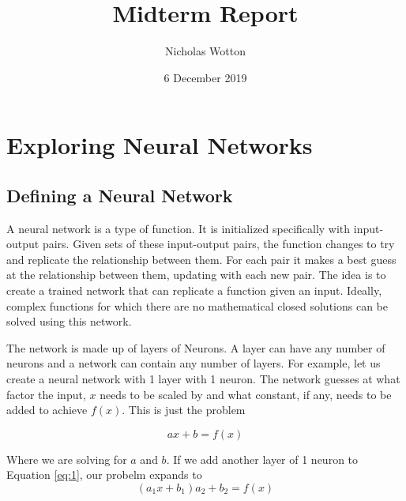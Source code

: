 \documentclass{report}
\title{Midterm Report}
\author{Nicholas Wotton}
\date{6 December 2019}
\begin{document}
\begin{titlepage}
\maketitle
\end{titlepage}

\begin{comment}
Outline
\begin{itemize}
\item What is a Neural Network
\item Derivation of the BSM
\item Combining the Two?
\end{itemize}
\end{comment}

\chapter{Exploring Neural Networks}

\section{Defining a Neural Network}

A neural network is a type of function. It is initialized specifically with input-output pairs. Given sets of these input-output pairs, the function changes to try and replicate the relationship between them. For each pair it makes a best guess at the relationship between them, updating with each new pair. The idea is to create a trained network that can replicate a function given an input. Ideally, complex functions for which there are no mathematical closed solutions can be solved using this network.

The network is made up of layers of Neurons. A layer can have any number of neurons and a network can contain any number of layers. For example, let us create a neural network with 1 layer with 1 neuron. The network guesses at what factor the input, $x$ needs to be scaled by and what constant, if any, needs to be added to achieve $f(x)$. This is just the problem

\begin{equation}
ax+b=f(x)\label{eq:1}
\end{equation}

Where we are solving for $a$ and $b$. If we add another layer of 1 neuron to Equation \ref{eq:1}, our probelm expands to
\begin{equation}
(a_1x+b_1)a_2+b_2 = f(x)
\end{equation}
\end{document}
